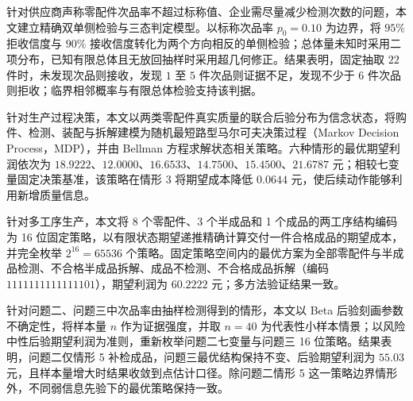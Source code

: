\begin{contestabstract}

针对供应商声称零配件次品率不超过标称值、企业需尽量减少检测次数的问题，本文建立精确双单侧检验与三态判定模型。以标称次品率 $p_0=0.10$ 为边界，将 $95\%$ 拒收信度与 $90\%$ 接收信度转化为两个方向相反的单侧检验；总体量未知时采用二项分布，已知有限总体且无放回抽样时采用超几何修正。结果表明，固定抽取 $22$ 件时，未发现次品则接收，发现 $1$ 至 $5$ 件次品则证据不足，发现不少于 $6$ 件次品则拒收；临界相邻概率与有限总体检验支持该判据。

针对生产过程决策，本文以两类零配件真实质量的联合后验分布为信念状态，将购件、检测、装配与拆解建模为随机最短路型马尔可夫决策过程（Markov Decision Process，MDP），并由 Bellman 方程求解状态相关策略。六种情形的最优期望利润依次为 $18.9222$、$12.0000$、$16.6533$、$14.7500$、$15.4500$、$21.6787$ 元；相较七变量固定决策基准，该策略在情形 3 将期望成本降低 $0.0644$ 元，使后续动作能够利用新增质量信息。

针对多工序生产，本文将 8 个零配件、3 个半成品和 1 个成品的两工序结构编码为 16 位固定策略，以有限状态期望递推精确计算交付一件合格成品的期望成本，并完全枚举 $2^{16}=65536$ 个策略。固定策略空间内的最优方案为全部零配件与半成品检测、不合格半成品拆解、成品不检测、不合格成品拆解（编码 $1111111111111101$），期望利润为 $60.2222$ 元；多方法验证结果一致。

针对问题二、问题三中次品率由抽样检测得到的情形，本文以 Beta 后验刻画参数不确定性，将样本量 $n$ 作为证据强度，并取 $n=40$ 为代表性小样本情景；以风险中性后验期望利润为准则，重新枚举问题二七变量与问题三 16 位策略。结果表明，问题二仅情形 5 补检成品，问题三最优结构保持不变、后验期望利润为 $55.03$ 元，且样本量增大时结果收敛到点估计口径。除问题二情形 5 这一策略边界情形外，不同弱信息先验下的最优策略保持一致。

\end{contestabstract}

